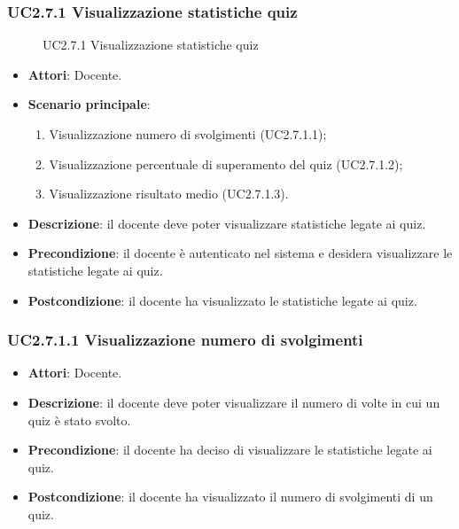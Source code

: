 \subsubsection{UC2.7.1 Visualizzazione statistiche quiz}
\begin{figure}[H]
\centering
\noindent{}
\caption{UC2.7.1 Visualizzazione statistiche quiz}
\end{figure}
\begin{itemize}
\item \textbf{Attori}: Docente.
\item \textbf{Scenario principale}:
\begin{enumerate}
\item Visualizzazione numero di svolgimenti (UC2.7.1.1);
\item Visualizzazione percentuale di superamento del quiz (UC2.7.1.2);
\item Visualizzazione risultato medio (UC2.7.1.3).
\end{enumerate}
\item \textbf{Descrizione}: il docente deve poter visualizzare statistiche legate ai quiz.
\item \textbf{Precondizione}: il docente è autenticato nel sistema e desidera visualizzare le statistiche legate ai quiz.
\item \textbf{Postcondizione}: il docente ha visualizzato le statistiche legate ai quiz.
\end{itemize}
\subsubsection{UC2.7.1.1 Visualizzazione numero di svolgimenti}
\begin{itemize}
\item \textbf{Attori}: Docente.
\item \textbf{Descrizione}: il docente deve poter visualizzare il numero di volte in cui un quiz è stato svolto.
\item \textbf{Precondizione}: il docente ha deciso di visualizzare le statistiche legate ai quiz.
\item \textbf{Postcondizione}: il docente ha visualizzato il numero di svolgimenti di un quiz.
\end{itemize}
